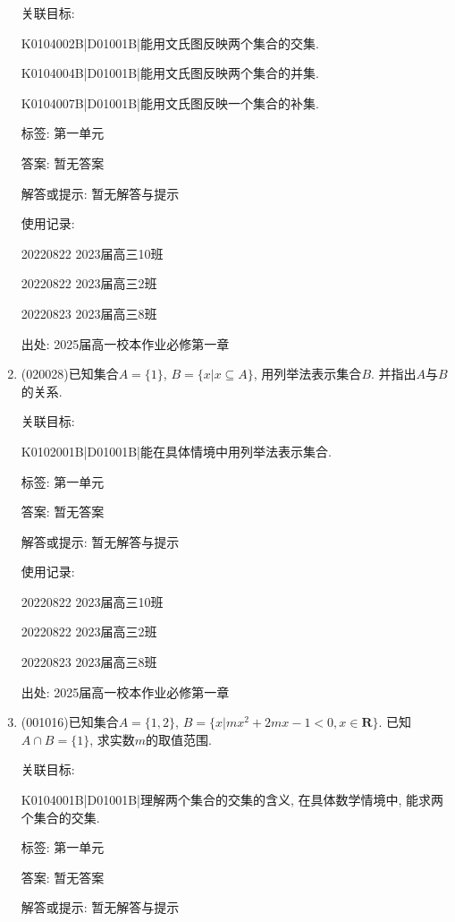 \documentclass[10pt,a4paper]{article}
\begin{document}
\begin{enumerate}[1.]
关联目标:

K0104002B|D01001B|能用文氏图反映两个集合的交集.

K0104004B|D01001B|能用文氏图反映两个集合的并集.

K0104007B|D01001B|能用文氏图反映一个集合的补集.



标签: 第一单元

答案: 暂无答案

解答或提示: 暂无解答与提示

使用记录:

20220822	2023届高三10班	

20220822	2023届高三2班			

20220823	2023届高三8班	


出处: 2025届高一校本作业必修第一章
\item { (020028)}已知集合$A=\{1\}$, $B=\{x|x\subseteq A\}$, 用列举法表示集合$B$. 并指出$A$与$B$的关系.


关联目标:

K0102001B|D01001B|能在具体情境中用列举法表示集合.



标签: 第一单元

答案: 暂无答案

解答或提示: 暂无解答与提示

使用记录:

20220822	2023届高三10班	

20220822	2023届高三2班	

20220823	2023届高三8班	


出处: 2025届高一校本作业必修第一章
\item { (001016)}已知集合$A=\{1,2\}$, $B=\{x|mx^2+2mx-1<0, x \in\mathbf{R}\}$. 已知$A \cap B=\{1\}$, 求实数$m$的取值范围.


关联目标:

K0104001B|D01001B|理解两个集合的交集的含义, 在具体数学情境中, 能求两个集合的交集.



标签: 第一单元

答案: 暂无答案

解答或提示: 暂无解答与提示


\end{enumerate}
\end{document}
